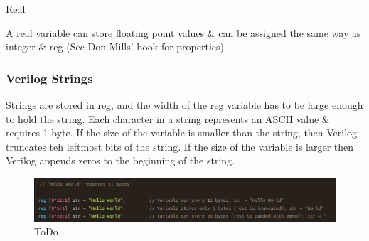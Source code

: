 \documentclass{article}
\begin{document}
	\underline{Real} \newline \newline

	A real variable can store floating point values \& can be assigned the same way as integer \& reg (See Don Mills' book for properties).

	\subsubsection{Verilog Strings}

	Strings are stored in reg, and the width of the reg variable has to be large enough to hold the string. Each character in a string represents an ASCII value \& requires 1 byte. If the size of the
	variable is smaller than the string, then Verilog truncates teh leftmost bits of the string. If the size of the variable is larger then Verilog appends zeros to the beginning of the string.

	\begin{figure}[H]
		\includegraphics[width=\linewidth]{VerilogPics/figure_14.png}
		\caption{ToDo}
		\label{ToDo}
	\end{figure}
\end{document}
